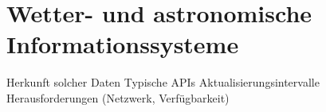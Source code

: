 \section{Wetter- und astronomische Informationssysteme} 
Herkunft solcher Daten
Typische APIs
Aktualisierungsintervalle
Herausforderungen (Netzwerk, Verfügbarkeit)
